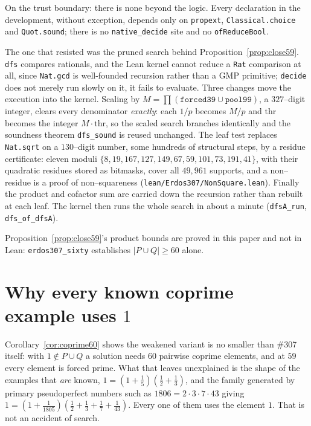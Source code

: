 \documentclass[11pt]{article}
\theoremstyle{definition}
\begin{document}
On the trust boundary: there is none beyond the logic. Every declaration in the development,
without exception, depends only on \texttt{propext}, \texttt{Classical.choice} and
\texttt{Quot.sound}; there is no \texttt{native\_decide} site and no \texttt{ofReduceBool}.

The one that resisted was the pruned search behind Proposition~\ref{prop:close59}. \texttt{dfs}
compares rationals, and the Lean kernel cannot reduce a \texttt{Rat} comparison at all, since
\texttt{Nat.gcd} is well-founded recursion rather than a \textup{GMP} primitive; \texttt{decide}
does not merely run slowly on it, it fails to evaluate. Three changes move the execution into the
kernel. Scaling by $M=\prod(\texttt{forced39}\cup\texttt{pool99})$, a $327$--digit integer, clears
every denominator \emph{exactly}: each $1/p$ becomes $M/p$ and $\mathrm{thr}$ becomes the integer
$M\cdot\mathrm{thr}$, so the scaled search branches identically and the soundness theorem
\texttt{dfs\_sound} is reused unchanged. The leaf test replaces \texttt{Nat.sqrt} on a $130$--digit
number, some hundreds of structural steps, by a residue certificate: eleven moduli
$\{8,19,167,127,149,67,59,101,73,191,41\}$, with their quadratic residues stored as bitmasks, cover
all $49{,}961$ supports, and a non--residue is a proof of non--squareness
\textup{(\texttt{lean/Erdos307/NonSquare.lean})}. Finally the product and cofactor sum are carried
down the recursion rather than rebuilt at each leaf. The kernel then runs the whole search in about
a minute \textup{(\texttt{dfsA\_run}, \texttt{dfs\_of\_dfsA})}.

Proposition~\ref{prop:close59}'s product bounds are proved in this paper and not in Lean:
\texttt{erdos307\_sixty} establishes $|P\cup Q|\ge60$ alone.

\section{Why every known coprime example uses $1$}\label{sec:coprime}

Corollary~\ref{cor:coprime60} shows the weakened variant is no smaller than \#307 itself: with
$1\notin P\cup Q$ a solution needs $60$ pairwise coprime elements, and at $59$ every element is
forced prime. What that leaves unexplained is the shape of the examples that \emph{are} known, $1=(1+\frac15)(\frac12+\frac13)$, and the family generated by primary pseudoperfect numbers such as
$1806=2\cdot3\cdot7\cdot43$ giving $1=(1+\frac1{1805})(\frac12+\frac13+\frac17+\frac1{43})$. Every
one of them uses the element $1$. That is not an accident of search.
\end{document}
